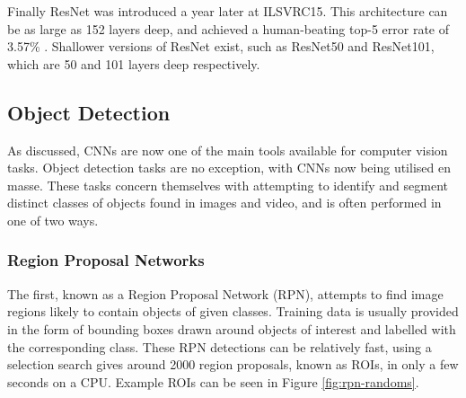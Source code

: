 Finally ResNet was introduced a year later at ILSVRC15. This architecture can be as large as 152 layers deep, and achieved a human-beating top-5 error rate of 3.57\% \cite{he_deep_2015}. Shallower versions of ResNet exist, such as ResNet50 and ResNet101, which are 50 and 101 layers deep respectively. 

\subsection{Object Detection}\label{ch:Background,sec:objectDetection}
As discussed, CNNs are now one of the main tools available for computer vision tasks. Object detection tasks are no exception, with CNNs now being utilised en masse. These tasks concern themselves with attempting to identify and segment distinct classes of objects found in images and video, and is often performed in one of two ways. 

\subsubsection{Region Proposal Networks}\label{ch:Background,sec:objectDetection,sub:RPN}
The first, known as a Region Proposal Network (RPN), attempts to find image regions likely to contain objects of given classes. Training data is usually provided in the form of bounding boxes drawn around objects of interest and labelled with the corresponding class. These RPN detections can be relatively fast, using a selection search \cite{uijlings_selective_2013} gives around 2000 region proposals, known as ROIs, in only a few seconds on a CPU. Example ROIs can be seen in Figure \ref{fig:rpn-randoms}.

